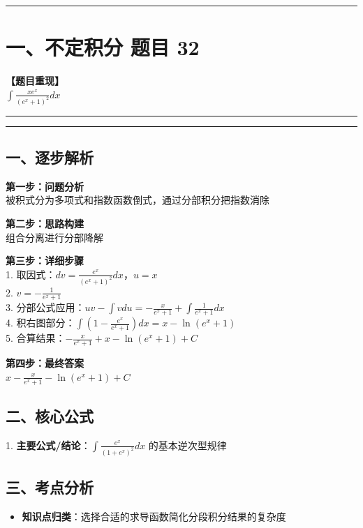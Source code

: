 ﻿\documentclass[12pt, a4paper]{ctexart}
\newcommand{\TopSeparator}{
    \par\noindent\rule{\textwidth}{1.5pt}\vspace{0.5em}
}
\newcommand{\AnalysisSeparator}{
    \par\noindent\rule{\textwidth}{0.5pt}\vspace{0.2em}\hrule\vspace{0.5em}
}
\newenvironment{RedAnalysis}{
    \par
    \color{red} 
}{
    \par
    \color{black} 
}
\begin{document}
\vspace{2em}

\TopSeparator
\section*{一、不定积分 题目 32}

\textbf{【题目重现】} \\
$\int \frac{x e^x}{(e^x+1)^2} dx$

\AnalysisSeparator

\begin{RedAnalysis}

	\subsection*{一、逐步解析}

	\textbf{第一步：问题分析} \\
	被积式分为多项式和指数函数倒式，通过分部积分把指数消除

	\textbf{第二步：思路构建} \\
	组合分离进行分部降解

	\textbf{第三步：详细步骤} \\
	1. 取因式：$dv = \frac{e^x}{(e^x+1)^2} dx$，$u = x$ \\ 
	2. $v = -\frac{1}{e^x+1}$ \\ 
	3. 分部公式应用：$uv - \int v du = -\frac{x}{e^x+1} + \int \frac{1}{e^x+1} dx$ \\ 
	4. 积右图部分：$\int (1 - \frac{e^x}{e^x+1}) dx = x - \ln(e^x+1)$ \\ 
	5. 合算结果：$-\frac{x}{e^x+1} + x - \ln(e^x+1) + C$

	\textbf{第四步：最终答案} \\
	$x - \frac{x}{e^x+1} - \ln(e^x+1) + C$

	\subsection*{二、核心公式}
	1. \textbf{主要公式/结论}：$\int \frac{e^x}{(1+e^x)^2} dx \text{ 的基本逆次型规律}$

	\subsection*{三、考点分析}
	\begin{itemize}
		\item \textbf{知识点归类}：选择合适的求导函数简化分段积分结果的复杂度
	\end{itemize}

\end{RedAnalysis}
\end{document}
